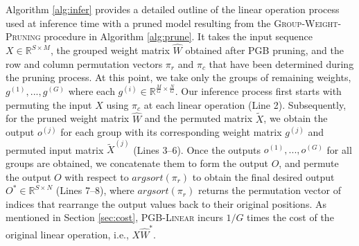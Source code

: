 \noindent Algorithm \ref{alg:infer} provides a detailed outline of the linear operation process used at inference time with a pruned model resulting from the \textsc{Group-Weight-Pruning} procedure in Algorithm \ref{alg:prune}. It takes the input sequence $X \in \mathbb{R}^{S \times M}$, the grouped weight matrix $\widehat{W}$ obtained after PGB pruning, and the row and column permutation vectors $\pi_r$ and $\pi_c$ that have been determined during the pruning process. At this point, we take only the groups of remaining weights, $g^{(1)},...,g^{(G)}$ where each $g^{(i)} \in \mathbb{R}^{\frac{M}{G}\times \frac{N}{G}}$. Our inference process first starts with permuting the input $X$ using $\pi_c$ at each linear operation (Line 2). Subsequently, for the pruned weight matrix $\widehat{W}$ and the permuted matrix $\widetilde{X}$, we obtain the output $o^{(j)}$ for each group with its corresponding weight matrix $g^{(j)}$ and permuted input matrix $\widetilde{X}^{(j)}$ (Lines 3--6). Once the outputs $o^{(1)},...,o^{(G)}$ for all groups are obtained, we concatenate them to form the output $O$, and permute the output $O$ with respect to $argsort(\pi_r)$ to obtain the final desired output $O^{*} \in \mathbb{R}^{S \times N}$ (Lines 7--8), where $argsort(\pi_r)$ returns the permutation vector of indices that rearrange the output values back to their original positions. As mentioned in Section \ref{sec:cost}, \textsc{PGB-Linear} incurs $1/G$ times the cost of the original linear operation, i.e., $X \widehat{W}^*$.
